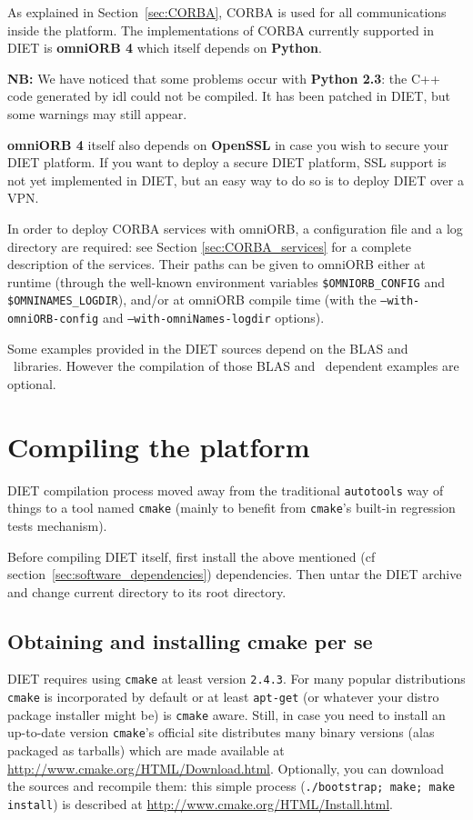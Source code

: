 As explained in Section~\ref{sec:CORBA}, CORBA is used for all
communications inside the platform.
The implementations of CORBA currently supported in DIET is
\textbf{omniORB 4} which itself depends on \textbf{Python}.

\noindent 
\textbf{NB:} We have noticed that some problems occur with
\textbf{Python 2.3}: the C++ code generated by idl could not be compiled.
It has been patched in DIET, but some warnings may still appear.

\textbf{omniORB 4} itself also depends on \textbf{OpenSSL} in case
you wish to secure your DIET platform.
If you want to deploy a secure DIET platform, SSL support is not yet
implemented  in DIET, but an easy way to do so is to deploy DIET over
a VPN.

In order to deploy CORBA services with omniORB, a configuration file
and a log directory are required: see Section
\ref{sec:CORBA_services} for a complete description of the services.
Their paths can be given to omniORB either at runtime (through the well-known
environment variables \texttt{\$OMNIORB\_CONFIG} and 
\texttt{\$OMNINAMES\_LOGDIR}), and/or at omniORB compile time (with the
\texttt{--with-omniORB-config} and \texttt{--with-omniNames-logdir}
options).

Some examples provided in the DIET sources depend on the BLAS
and \scalapack\ libraries. However the compilation of those BLAS and
\scalapack\ dependent examples are optional.

\section{Compiling the platform}
\label{sec:compil_platform}

DIET compilation process moved away from the traditional \verb+autotools+
way of things to a tool named \verb+cmake+ (mainly to benefit from
\verb+cmake+'s built-in regression tests mechanism).

Before compiling DIET itself, first install the above mentioned
(cf section~\ref{sec:software_dependencies}) dependencies.
Then untar the DIET archive and change current directory to its root directory.

\subsection{Obtaining and installing cmake per se}
DIET requires using \verb+cmake+ at least version \verb+2.4.3+.
For many popular distributions \verb+cmake+ is incorporated by
default or at least \verb+apt-get+ (or whatever your distro package installer
might be) is \verb+cmake+ aware.
Still, in case you need to install an up-to-date version \verb+cmake+'s
official site distributes many binary versions (alas packaged as tarballs)
which are made available at 
\url{http://www.cmake.org/HTML/Download.html}.
Optionally, you can download the sources and recompile them: this simple
process (\verb+./bootstrap; make; make install+) is described at
\url{http://www.cmake.org/HTML/Install.html}.

